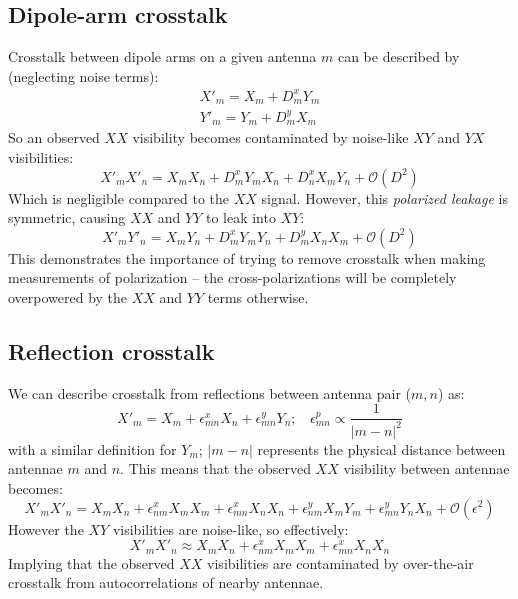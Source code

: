 \documentclass[10pt,a4paper,notitlepage]{article}
\begin{document}
\subsection{Dipole-arm crosstalk}
\label{subsec:theory_dterms}
Crosstalk between dipole arms on a given antenna $m$ can be described by (neglecting noise terms):
\begin{align*}
X'_m = X_m + D^x_mY_m\\
Y'_m = Y_m + D^y_mX_m
\end{align*}
\noindent So an observed $XX$ visibility becomes contaminated by noise-like $XY$ and $YX$ visibilities:
\begin{equation}
X'_mX'_n = X_mX_n + D^x_mY_mX_n + D^x_nX_mY_n  + \mathcal{O}(D^2)
\label{eq:XX_leakage}
\end{equation}
\noindent Which is negligible compared to the $XX$ signal. However, this \textit{polarized leakage} is symmetric, causing $XX$ and $YY$ to leak into $XY$:
\begin{equation}
X'_mY'_n=X_mY_n + D^x_mY_mY_n + D^y_mX_nX_m + \mathcal{O}(D^2)
\end{equation}
\noindent This demonstrates the importance of trying to remove crosstalk when making measurements of polarization -- the cross-polarizations will be completely overpowered by the $XX$ and $YY$ terms otherwise.

\subsection{Reflection crosstalk}
\label{subsec:theory_reflection}
We can describe crosstalk from reflections between antenna pair ($m,n$) as:
\begin{equation}
X'_m = X_m + \epsilon^x_{mn}X_n + \epsilon^y_{mn}Y_n;~~~~\epsilon^p_{mn}\propto\frac{1}{|m-n|^2}
\end{equation}
\noindent with a similar definition for $Y_m$; $|m-n|$ represents the physical distance between antennae $m$ and $n$. This means that the observed $XX$ visibility between antennae becomes:
\begin{equation}
X'_mX'_n = X_mX_n + \epsilon^x_{nm}X_mX_m + \epsilon^x_{mn}X_nX_n + \epsilon^y_{nm}X_mY_m + \epsilon^y_{mn}Y_nX_n + \mathcal{O}(\epsilon^2)
\label{eq:XX_reflection}
\end{equation}
\noindent However the $XY$ visibilities are noise-like, so effectively:
\begin{equation}
X'_mX'_n \approx X_mX_n + \epsilon^x_{nm}X_mX_m + \epsilon^x_{mn}X_nX_n 
\end{equation}
\noindent Implying that the observed $XX$ visibilities are contaminated by over-the-air crosstalk from autocorrelations of nearby antennae.
\end{document}
